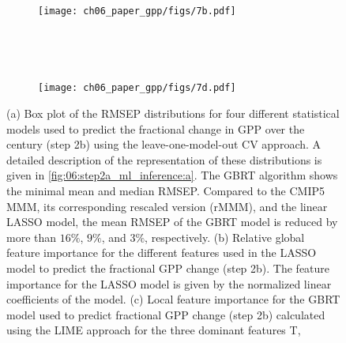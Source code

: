 \begin{figure}[p]
  \centering
  \begin{subfigure}[b]{\SubfigureWidth{}}
    \caption{}
    \label{fig:06:step2b_ml_inference:a}
  \end{subfigure}
  ~
  \begin{subfigure}[b]{\SubfigureWidth{}}
    \texttt{[image: ch06\_paper\_gpp/figs/7b.pdf]}
    \caption{}
    \label{fig:06:step2b_ml_inference:b}
  \end{subfigure}
  \\
  \begin{subfigure}[b]{\SubfigureWidth{}}
    \caption{}
    \label{fig:06:step2b_ml_inference:c}
  \end{subfigure}
  ~
  \begin{subfigure}[b]{\SubfigureWidth{}}
    \texttt{[image: ch06\_paper\_gpp/figs/7d.pdf]}
    \caption{}
    \label{fig:06:step2b_ml_inference:d}
  \end{subfigure}
  \caption[
    Prediction error in a leave-one-model-out \acl{CV} setup and feature
    importance of our \acl{ML} approach to constrain the fractional change in
    \acf{GPP} over the  century in step 2b.
  ]{
    (a) Box plot of the \acf{RMSEP} distributions for four different
    statistical models used to predict the fractional change in \acf{GPP} over
    the  century (step 2b) using the leave-one-model-out \acl{CV}
    approach. A detailed description of the representation of these
    distributions is given in \cref{fig:06:step2a_ml_inference:a}. The
    \acf{GBRT} algorithm shows the minimal mean and median \acs{RMSEP}.
    Compared to the \acs{CMIP}5 \acf{MMM}, its corresponding rescaled version
    (r\acs{MMM}), and the linear \acf{LASSO} model, the mean \acs{RMSEP} of the
    \acs{GBRT} model is reduced by more than $16 \unit{\%}$, $9 \unit{\%}$, and
    $3 \unit{\%}$, respectively. (b) Relative global feature importance for the
    different features used in the \acs{LASSO} model to predict the fractional
    \acs{GPP} change (step 2b). The feature importance for the \acs{LASSO}
    model is given by the normalized linear coefficients of the model. (c)
    Local feature importance for the \acs{GBRT} model used to predict
    fractional \acs{GPP} change (step 2b) calculated using the \acf{LIME}
    approach \autocite{Ribeiro2016} for the three dominant features \acf{T},
}
\end{figure}
